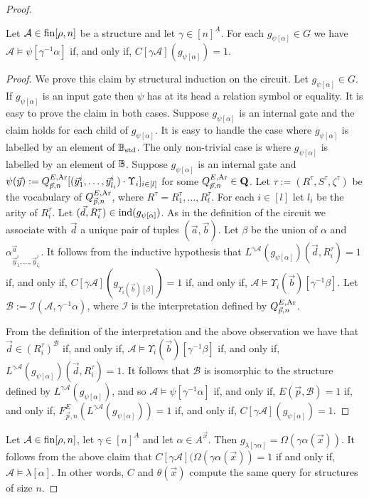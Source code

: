 \documentclass[../main/thesis.tex]{subfiles}
\begin{document}
\begin{proof}
\begin{claim}
  Let $\mathcal{A} \in \text{\upshape fin}[\rho, n]$ be a structure and let $\gamma \in
  [n]^{\underline{A}}$. For each $g_{\psi[\alpha]} \in G$ we have $\mathcal{A}
  \models \psi[\gamma^{-1}\alpha]$ if, and only if, $C[\gamma
  \mathcal{A}](g_{\psi[\alpha]}) = 1$.
\end{claim}
\begin{proof}
  We prove this claim by structural induction on the circuit. Let
  $g_{\psi[\alpha]} \in G$. If $g_{\psi[\alpha]}$ is an input gate then $\psi$
  has at its head a relation symbol or equality. It is easy to prove the claim
  in both cases. Suppose $g_{\psi[\alpha]}$ is an internal gate and the claim
  holds for each child of $g_{\psi[\alpha]}$. It is easy to handle the case
  where $g_{\psi[\alpha]}$ is labelled by an element of $\mathbb{B}_{\text{std}}$. The only
  non-trivial case is where $g_{\psi[\alpha]}$ is labelled by an element of
  $\mathbb{B}$. Suppose $g_{\psi[\alpha]}$ is an internal gate and $\psi (\vec{y}) :=
  Q^{E, \text{\upshape Ar}}_{\vec{p}, n} [(\vec{y}^i_1, \ldots, \vec{y}^i_{l_i}) \cdot
  \Upsilon_i]_{i \in [l]}$ for some $Q^{E, \text{\upshape Ar}}_{\vec{p}, n} \in \mathbf{Q}$. Let
  $\tau := (R^\tau, S^\tau, \zeta^\tau)$ be the vocabulary of $Q^{E,
    \text{\upshape Ar}}_{\vec{p}, n}$, where $R^\tau = {R^\tau_1, \ldots, R^\tau_l}$. For each
  $i \in [l]$ let $l_i$ be the arity of $R^\tau_i$. Let $(\vec{d}, R^\tau_i) \in
  \text{\upshape ind}(g_{\psi[\alpha]})$. As in the definition of the circuit we associate with
  $\vec{d}$ a unique pair of tuples $(\vec{a}, \vec{b})$. Let $\beta$ be the
  union of $\alpha$ and $\alpha^{\vec{a}}_{\vec{y}^i_1, \ldots,
    \vec{y}^i_{l_i}}$. It follows from the inductive hypothesis that $L^{\gamma
    \mathcal{A}}(g_{\psi[\alpha]})(\vec{d}, R^\tau_i) = 1$ if, and only if,
  $C[\gamma \mathcal{A}](g_{\Upsilon_i(\vec{b})[\beta]}) = 1$ if, and only if,
  $\mathcal{A} \models \Upsilon_i (\vec{b})[\gamma^{-1} \beta]$. Let
  $\mathcal{B} := \mathcal{I}(\mathcal{A}, \gamma^{-1} \alpha)$, where
  $\mathcal{I}$ is the interpretation defined by $Q^{E, \text{\upshape Ar}}_{\vec{p}, n}$.

  From the definition of the interpretation and the above observation we have
  that $\vec{d} \in (R^\tau_i)^{\mathcal{B}}$ if, and only if, $\mathcal{A}
  \models \Upsilon_i (\vec{b})[\gamma^{-1} \beta]$ if, and only if, $L^{\gamma
    \mathcal{A}}(g_{\psi[\alpha]})(\vec{d}, R^{\tau}_i) = 1$. It follows that
  $\mathcal{B}$ is isomorphic to the structure defined by $L^{\gamma
    \mathcal{A}}(g_{\psi [\alpha]})$, and so $\mathcal{A} \models
  \psi[\gamma^{-1} \alpha]$ if, and only if, $E(\vec{p}, \mathcal{B}) = 1$ if,
  and only if, $F^E_{\vec{p}, n}(L^{\gamma \mathcal{A}}(g_{\psi[\alpha]})) = 1$
  if, and only if, $C[\gamma \mathcal{A}] (g_{\psi[\alpha]}) = 1$.
\end{proof}
Let $\mathcal{A} \in \text{\upshape fin}[\rho, n]$, let $\gamma \in [n]^{\underline{A}}$ and
let $\alpha \in A^{\vec{x}}$. Then $g_{\lambda [\gamma \alpha]} = \Omega (\gamma
\alpha (\vec{x}))$. It follows from the above claim that $C [\gamma \mathcal{A}]
(\Omega( \gamma \alpha (\vec{x})) = 1$ if and only if, $\mathcal{A} \models
\lambda [\alpha]$. In other words, $C$ and $\theta(\vec{x})$ compute the same
query for structures of size $n$.



\end{proof}
\end{document}
